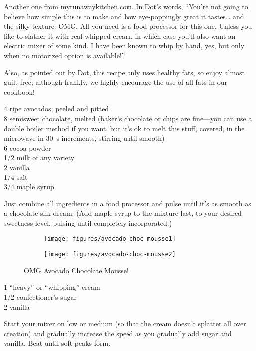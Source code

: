 \begin{open}
    Another one from \url{myrunawaykitchen.com}.  In Dot's words, ``You’re not going to believe how simple this is to make and how eye-poppingly great it tastes… and the silky texture: OMG.  All you need is a food processor for this one.  Unless you like to slather it with real whipped cream, in which case you’ll also want an electric mixer of some kind.  I have been known to whip by hand, yes, but only when no motorized option is available!''

    Also, as pointed out by Dot, this recipe only uses healthy fats, so enjoy almost guilt free; although frankly, we highly encourage the use of all fats in our cookbook!
\end{open}
\begin{ingredients}
    4 ripe avocados, peeled and pitted\\
    \SI{8}{\ounce} semisweet chocolate, melted (baker’s chocolate or chips are fine---you can use a double boiler method if you want, but it's ok to melt this stuff, covered, in the microwave in \SI{30}{\second} increments, stirring until smooth)\\
    \SI{6}{\tblspoon} cocoa powder\\
    \SI{1/2}{\cup} milk of any variety\\
    \SI{2}{\teaspoon} vanilla\\
    \SI{1/4}{\teaspoon} salt\\
    \SI{3/4}{\cup} maple syrup
\end{ingredients}
Just combine all ingredients in a food processor and pulse until it’s as smooth
as a chocolate silk dream.  (Add maple syrup to the mixture last, to your
desired sweetness level, pulsing until completely incorporated.)
\begin{figure}
    \centering
    \begin{subfigure}{0.4\textwidth}
        \centering
        \texttt{[image: figures/avocado-choc-mousse1]}
    \end{subfigure}
    \begin{subfigure}{0.4\textwidth}
        \centering
        \texttt{[image: figures/avocado-choc-mousse2]}
    \end{subfigure}
    \caption*{OMG Avocado Chocolate Mousse!}
\end{figure}


\begin{ingredients}
    \SI{1}{\quart} ``heavy'' or ``whipping'' cream\\
    \SI{1/2}{\cup} confectioner's sugar\\
    \SI{2}{\teaspoon} vanilla
\end{ingredients}
Start your mixer on low or medium (so that the cream doesn't splatter all over creation) and gradually increase the speed as you gradually add sugar and vanilla.  Beat until soft peaks form.

